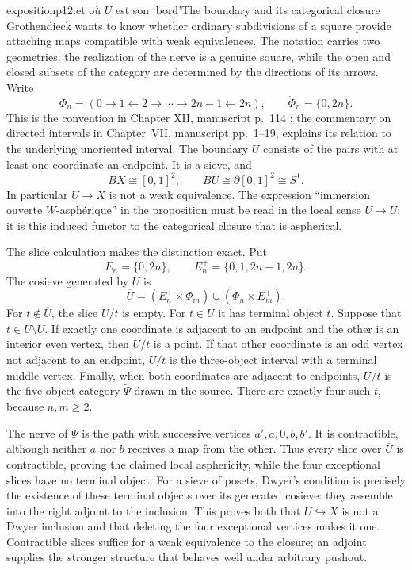 \begin{dcomment}{exposition}{p12:et où $U$ est son ‘bord’}{The boundary and its categorical closure}
Grothendieck wants to know whether ordinary subdivisions of a square provide attaching maps compatible with weak equivalences. The notation carries two geometries: the realization of the nerve is a genuine square, while the open and closed subsets of the category are determined by the directions of its arrows. Write
\[
 \Phi_n=(0\longrightarrow1\longleftarrow2\longrightarrow\cdots
                \longrightarrow2n-1\longleftarrow2n),
 \qquad \dot\Phi_n=\{0,2n\}.
\]
This is the convention in Chapter XII, manuscript p.~114 \citep{Grothendieck1990XII}; the commentary on directed intervals in Chapter~VII, manuscript pp.~1--19, explains its relation to the underlying unoriented interval. The boundary $U$ consists of the pairs with at least one coordinate an endpoint. It is a sieve, and
\[
 BX\cong[0,1]^2,\qquad BU\cong\partial[0,1]^2\cong S^1.
\]
In particular $U\to X$ is not a weak equivalence. The expression ``immersion ouverte $W$-asph\'erique'' in the proposition must be read in the local sense $U\to\overline U$: it is this induced functor to the categorical closure that is aspherical.

The slice calculation makes the distinction exact. Put
\[
 E_n=\{0,2n\},\qquad E_n^+=\{0,1,2n-1,2n\}.
\]
The cosieve generated by $U$ is
\[
 \overline U=(E_n^+\times\Phi_m)\cup(\Phi_n\times E_m^+).
\]
For $t\notin\overline U$, the slice $U/t$ is empty. For $t\in U$ it has terminal object $t$. Suppose that $t\in\overline U\setminus U$. If exactly one coordinate is adjacent to an endpoint and the other is an interior even vertex, then $U/t$ is a point. If that other coordinate is an odd vertex not adjacent to an endpoint, $U/t$ is the three-object interval with a terminal middle vertex. Finally, when both coordinates are adjacent to endpoints, $U/t$ is the five-object category $\widetilde\Psi$ drawn in the source. There are exactly four such $t$, because $n,m\geq2$.

The nerve of $\widetilde\Psi$ is the path with successive vertices $a',a,0,b,b'$. It is contractible, although neither $a$ nor $b$ receives a map from the other. Thus every slice over $\overline U$ is contractible, proving the claimed local asphericity, while the four exceptional slices have no terminal object. For a sieve of posets, Dwyer's condition is precisely the existence of these terminal objects over its generated cosieve: they assemble into the right adjoint to the inclusion. This proves both that $U\hookrightarrow X$ is not a Dwyer inclusion and that deleting the four exceptional vertices makes it one. Contractible slices suffice for a weak equivalence to the closure; an adjoint supplies the stronger structure that behaves well under arbitrary pushout.
\end{dcomment}

